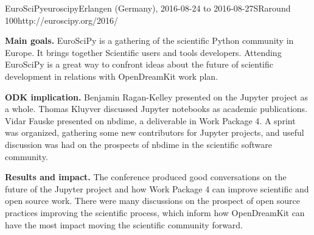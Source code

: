 \begin{event}{EuroSciPy}{euroscipy}{Erlangen (Germany), 2016-08-24 to 2016-08-27}{SR}{around 100}{http://euroscipy.org/2016/}

\textbf{Main goals.} EuroSciPy is a gathering of the scientific Python community in Europe.
It brings together Scientific users and tools developers. Attending EuroSciPy
 is a great way to confront ideas about the future of scientific development
in relations with OpenDreamKit work plan.

\textbf{ODK implication.} Benjamin Ragan-Kelley presented on the Jupyter project as a whole.
Thomas Kluyver discussed Jupyter notebooks as academic publications.
Vidar Fauske presented on nbdime, a deliverable in Work Package 4.
A sprint was organized, gathering some new contributors for Jupyter projects,
and useful discussion was had on the prospects of nbdime in the scientific software community.

\textbf{Results and impact.} The conference produced good conversations on the future of the Jupyter project and how Work Package 4 can improve scientific and open source work.
There were many discussions on the prospect of open source practices improving the scientific process,
which inform how OpenDreamKit can have the most impact moving the scientific community forward.
\end{event}
